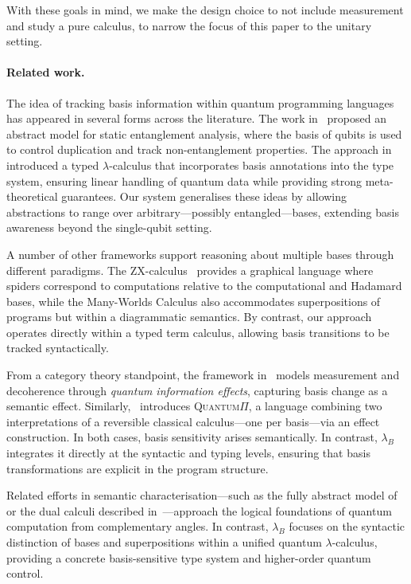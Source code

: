 \documentclass[a4paper,UKenglish,numberwithinsect,pdfa,anonymous]{lipics-v2021}
\theoremstyle{restatestyle}
\newcommand{\lambdaB}{\lambda_B}
\begin{document}
With these goals in mind, we make the design choice to not include measurement and
study a pure calculus, to narrow the focus of this paper to the 
unitary setting.

\paragraph*{Related work.}
The idea of tracking basis information within quantum programming languages has
appeared in several forms across the literature.  
The work in~\cite{Perdrix2008} proposed an abstract model for static
entanglement analysis, where the basis of qubits is used to control duplication
and track non-entanglement properties.  
The approach in~\cite{DiazcaroMonzonAPLAS25} introduced a typed
$\lambda$-calculus that incorporates basis annotations into the type system,
ensuring linear handling of quantum data while providing strong
meta-theoretical guarantees.  
Our system generalises these ideas by allowing abstractions to range over
arbitrary---possibly entangled---bases, extending basis awareness beyond the
single-qubit setting.

A number of other frameworks support reasoning about multiple bases through
different paradigms. The ZX-calculus~\cite{CoeckeRossICALP08} provides a
graphical language where spiders correspond to computations relative to the
computational and Hadamard bases, while the Many-Worlds Calculus
\cite{ChardonnetdeVismeValironVilmartLMCS25} also accommodates
superpositions of programs but within a diagrammatic semantics.  
By contrast, our approach operates directly within a typed term calculus,
allowing basis transitions to be tracked syntactically.

From a category theory standpoint, the framework
in~\cite{HeunenKaarsgaard2021} models measurement and decoherence through
\emph{quantum information effects}, capturing basis change as a semantic
effect.  
Similarly,~\cite{CaretteHeunenKaarsgaardSabry2024} introduces
\textsc{Quantum}$\Pi$, a language combining two interpretations of a reversible
classical calculus—one per basis—via an effect construction.  
In both cases, basis sensitivity arises semantically.  
In contrast, $\lambdaB$ integrates it directly at the syntactic and typing
levels, ensuring that basis transformations are explicit in the program structure.

Related efforts in semantic characterisation—such as the fully
abstract model of~\cite{ClairambaultdeVisme2019} or the dual calculi
described in~\cite{ChoudhuryGay2025}—approach the logical foundations of
quantum computation from complementary angles.  
In contrast, $\lambdaB$ focuses on the syntactic distinction of bases and
superpositions within a unified quantum $\lambda$-calculus, providing a concrete
basis-sensitive type system and higher-order quantum control.
\end{document}
